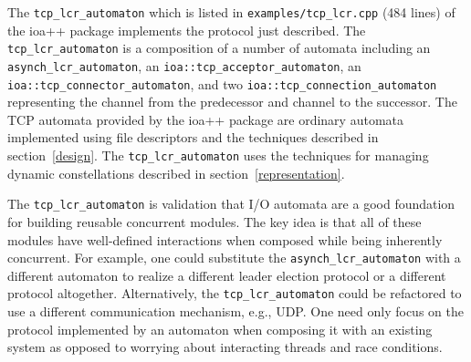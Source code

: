 The \verb+tcp_lcr_automaton+ which is listed in \verb+examples/tcp_lcr.cpp+ (484 lines) of the ioa++ package implements the protocol just described.
The \verb+tcp_lcr_automaton+ is a composition of a number of automata including an \verb+asynch_lcr_automaton+, an \verb+ioa::tcp_acceptor_automaton+, an \verb+ioa::tcp_connector_automaton+, and two \verb+ioa::tcp_connection_automaton+ representing the channel from the predecessor and channel to the successor.
The TCP automata provided by the ioa++ package are ordinary automata implemented using file descriptors and the techniques described in section~\ref{design}.
The \verb+tcp_lcr_automaton+ uses the techniques for managing dynamic constellations described in section~\ref{representation}.

The \verb+tcp_lcr_automaton+ is validation that I/O automata are a good foundation for building reusable concurrent modules.
The key idea is that all of these modules have well-defined interactions when composed while being inherently concurrent.
For example, one could substitute the \verb+asynch_lcr_automaton+ with a different automaton to realize a different leader election protocol or a different protocol altogether.
Alternatively, the \verb+tcp_lcr_automaton+ could be refactored to use a different communication mechanism, e.g., UDP.
One need only focus on the protocol implemented by an automaton when composing it with an existing system as opposed to worrying about interacting threads and race conditions.



